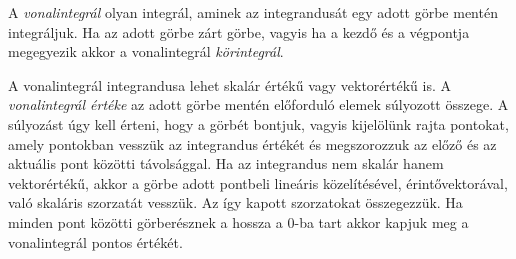 \documentclass[DIV=15,appendixprefix]{scrreprt}
\theoremstyle{definition}
\theoremstyle{remark}
\begin{document}
A \emph{vonalintegrál} olyan integrál, aminek az integrandusát egy adott görbe mentén integráljuk.
Ha az adott görbe zárt görbe, vagyis ha a kezdő és a végpontja megegyezik akkor a vonalintegrál
\emph{körintegrál}.

A vonalintegrál integrandusa lehet skalár	értékű vagy vektorértékű is. A \emph{vonalintegrál
értéke} az adott görbe mentén előforduló elemek súlyozott összege. A súlyozást úgy kell érteni, hogy
a görbét  bontjuk, vagyis kijelölünk rajta pontokat, amely pontokban vesszük az
integrandus értékét és megszorozzuk az előző és az aktuális pont közötti távolsággal. Ha az
integrandus nem skalár hanem vektorértékű, akkor a görbe adott pontbeli lineáris közelítésével,
érintővektorával, való skaláris szorzatát vesszük. Az így kapott szorzatokat összegezzük. Ha minden
pont közötti görberésznek a hossza a 0-ba tart akkor kapjuk meg a vonalintegrál pontos értékét.
\end{document}
